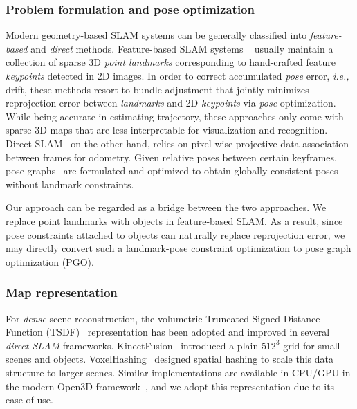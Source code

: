 \subsubsection{Problem formulation and pose optimization}
Modern geometry-based SLAM systems can be generally classified into \textit{feature-based} and \textit{direct} methods.
%
Feature-based SLAM systems ~\cite{mur-artalORBSLAM2OpenSourceSLAM2017, kleinParallelTrackingMapping2007} usually maintain a collection of sparse 3D \textit{point landmarks} corresponding to hand-crafted feature \textit{keypoints} detected in 2D images. In order to correct accumulated \textit{pose} error, \textit{i.e.,} drift, these methods resort to bundle adjustment \cite{triggsBundleAdjustmentModern2000} that jointly minimizes reprojection error between \textit{landmarks} and 2D \textit{keypoints} via \textit{pose} optimization. While being accurate in estimating trajectory, these approaches only come with sparse 3D maps that are less interpretable for visualization and recognition.
%
Direct SLAM~\cite{engelLSDSLAMLargeScaleDirect, engelDirectSparseOdometry2018} on the other hand, relies on pixel-wise projective data association between frames for odometry. Given relative poses between certain keyframes, pose graphs~\cite{dellaertFactorGraphsRobot2017} are formulated and optimized to obtain globally consistent poses without landmark constraints.

Our approach can be regarded as a bridge between the two approaches. We replace point landmarks with objects in feature-based SLAM. As a result, since pose constraints attached to objects can naturally replace reprojection error, we may directly convert such a landmark-pose constraint optimization to pose graph optimization (PGO).

\subsubsection{Map representation}
For \textit{dense} scene reconstruction, the volumetric Truncated Signed Distance Function (TSDF)~\cite{curlessVolumetricMethodBuilding1996} representation has been adopted and improved in several \textit{direct SLAM} frameworks. KinectFusion~\cite{newcombeKinectFusionRealtimeDense2011} introduced a plain $512^3$ grid for small scenes and objects. VoxelHashing~\cite{niessnerRealtime3DReconstruction2013} designed spatial hashing to scale this data structure to larger scenes. Similar implementations are available in CPU/GPU in the modern Open3D framework~\cite{zhouOpen3DModernLibrary2018, dongGPUAcceleratedRobust2019}, and we adopt this representation due to its ease of use.

